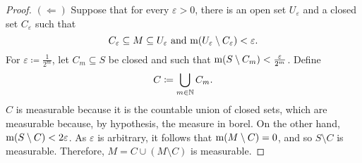 \begin{prp}
\begin{proof}
\blankline
\noindent
$(\Leftarrow )$ Suppose that for every $\varepsilon >0$, there is an open set $U_{\varepsilon}$ and a closed set $C_{\varepsilon}$ such that
\begin{equation}
C_{\varepsilon}\subseteq M\subseteq U_{\varepsilon}\text{ and }\mathrm{m} (U_{\varepsilon}\setminus C_{\varepsilon})<\varepsilon .
\end{equation}
For $\varepsilon \coloneqq \frac{1}{2^m}$, let $C_m\subseteq S$ be closed and such that $\mathrm{m} (S\setminus C_m)<\frac{\varepsilon}{2^m}$.  Define
\begin{equation}
C\coloneqq \bigcup _{m\in \mathbb{N}}C_m.
\end{equation}
$C$ is measurable because it is the countable union of closed sets, which are measurable because, by hypothesis, the measure in borel.  On the other hand, $\mathrm{m} (S\setminus C)<2\varepsilon$.  As $\varepsilon$ is arbitrary, it follows that $\mathrm{m} (M\setminus C)=0$, and so $S\setminus C$ is measurable.  Therefore, $M=C\cup (M\setminus C)$ is measurable.
\end{proof}
\end{prp}


